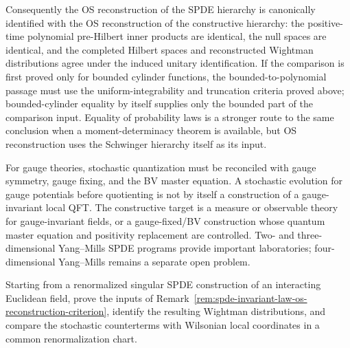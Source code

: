 \begin{construction}
Consequently the OS reconstruction of the SPDE hierarchy is canonically
identified with the OS reconstruction of the constructive hierarchy: the
positive-time polynomial pre-Hilbert inner products are identical, the null
spaces are identical, and the completed Hilbert spaces and reconstructed
Wightman distributions agree under the induced unitary identification.  If
the comparison is first proved only for bounded cylinder functions, the
bounded-to-polynomial passage must use the uniform-integrability and
truncation criteria proved above; bounded-cylinder equality by itself supplies
only the bounded part of the comparison input.  Equality of probability laws
is a stronger route to the same conclusion when a moment-determinacy theorem is
available, but OS reconstruction uses the Schwinger hierarchy itself as its
input.
\end{construction}

\begin{remark}
\label{rem:spde-gauge-bv-compatibility}
For gauge theories, stochastic quantization must be reconciled with gauge
symmetry, gauge fixing, and the BV master equation.  A stochastic evolution
for gauge potentials before quotienting is not by itself a construction of a
gauge-invariant local QFT.  The constructive target is a measure or
observable theory for gauge-invariant fields, or a gauge-fixed/BV
construction whose quantum master equation and positivity replacement are
controlled.  Two- and three-dimensional Yang--Mills SPDE programs provide
important laboratories; four-dimensional Yang--Mills remains a separate open
problem.
\end{remark}

\begin{openproblem}
\label{op:spde-to-wightman-construction}
Starting from a renormalized singular SPDE construction of an interacting
Euclidean field, prove the inputs of
Remark~\ref{rem:spde-invariant-law-os-reconstruction-criterion},
identify the resulting Wightman distributions, and compare the stochastic
counterterms with Wilsonian local coordinates in a common renormalization
chart.
\end{openproblem}
